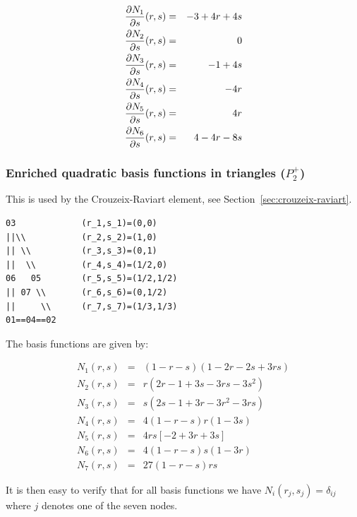 \begin{eqnarray}
\frac{\partial N_1}{\partial s}(r,s) &=&  -3+4r+4s\nonumber\\ 
\frac{\partial N_2}{\partial s}(r,s) &=&  0\nonumber\\ 
\frac{\partial N_3}{\partial s}(r,s) &=&  -1+4s\nonumber\\ 
\frac{\partial N_4}{\partial s}(r,s) &=&  -4r\nonumber\\ 
\frac{\partial N_5}{\partial s}(r,s) &=&  4r\nonumber\\ 
\frac{\partial N_6}{\partial s}(r,s) &=&  4-4r-8s\nonumber
\end{eqnarray}



\subsubsection{Enriched quadratic basis functions in triangles ($P_2^+$)}

This is used by the Crouzeix-Raviart element, see Section~\ref{sec:crouzeix-raviart}. 

\begin{verbatim}
03             (r_1,s_1)=(0,0)
||\\           (r_2,s_2)=(1,0)
|| \\          (r_3,s_3)=(0,1)
||  \\         (r_4,s_4)=(1/2,0)
06   05        (r_5,s_5)=(1/2,1/2)
|| 07 \\       (r_6,s_6)=(0,1/2)
||     \\      (r_7,s_7)=(1/3,1/3)
01==04==02    
\end{verbatim}

The basis functions are given by:

\begin{mdframed}[backgroundcolor=blue!5]
\begin{eqnarray}
N_1(r,s) &=&  (1-r-s)(1-2r-2s+ 3rs) \\
N_2(r,s) &=& r (2 r -1 + 3s-3rs-3s^2 ) \\
N_3(r,s) &=& s (2s -1 + 3r-3r^2-3rs )\\
N_4(r,s) &=& 4(1-r-s)r(1 -3s ) \\
N_5(r,s) &=& 4rs [-2+3r+3s]\\
N_6(r,s) &=& 4(1-r-s)s(1-3r)\\
N_7(r,s) &=& 27 (1-r-s)rs 
\end{eqnarray}
\end{mdframed}
It is then easy to verify that for all basis functions we have 
$N_i(r_j,s_j)=\delta_{ij}$ where $j$ denotes one of the seven nodes. 

